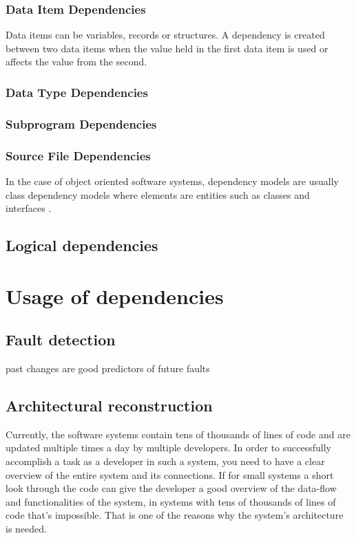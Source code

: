 \documentclass[12pt]{mitthesis}
\begin{document}
\subsubsection{Data Item Dependencies}
Data items can be variables, records or structures. A dependency is created between two data items when the value held in the first data item is used or affects the value from the second.

\subsubsection{Data Type Dependencies}

\subsubsection{Subprogram Dependencies}
\subsubsection{Source File Dependencies}


In the case of object oriented software systems, dependency models are usually class dependency models where elements are entities such as classes and interfaces \cite{Sangal:2005:UDM:1094811.1094824}. 

\subsection{Logical dependencies}

\section{Usage of dependencies}

\subsection{Fault detection}
past changes are good predictors of future faults
\subsection{Architectural reconstruction}
Currently, the software systems contain tens of thousands of lines of code and are updated multiple times a day by multiple developers.  In order to successfully accomplish a task as a developer in such a system, you need to have a clear overview of the entire system and its connections. If for small systems a short look through the code can give the developer a good overview of the data-flow and functionalities of the system, in systems with tens of thousands of lines of code that's impossible. That is one of the reasons why the system's architecture is needed.
\end{document}
